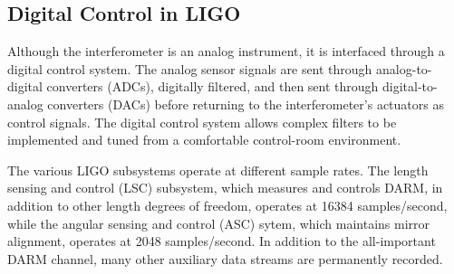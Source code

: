 





\subsection{Digital Control in LIGO}
Although the interferometer is an analog instrument, it is interfaced
through a digital control system. The analog sensor signals are sent
through analog-to-digital converters (ADCs), digitally filtered, and
then sent through digital-to-analog converters (DACs) before returning
to the interferometer's actuators as control signals. The 
digital control system allows complex filters to be implemented and
tuned from a comfortable control-room environment.

The various LIGO subsystems operate at different sample rates.  The
length sensing and control (LSC) subsystem, which measures and
controls DARM, in addition to other length degrees of freedom,
operates at 16384 samples/second, while the angular sensing and
control (ASC) sytem, which maintains mirror alignment, operates at
2048 samples/second.  In addition to the all-important DARM channel,
many other auxiliary data streams are permanently recorded.

